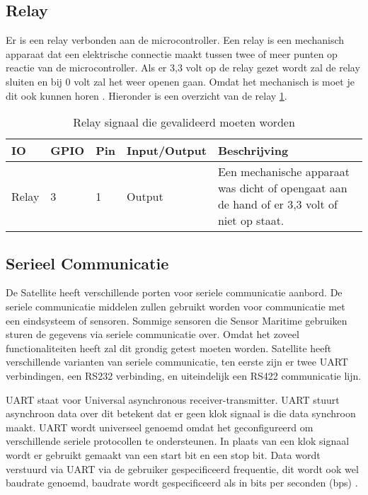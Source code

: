 \subsection{Relay}
Er is een relay verbonden aan de microcontroller. Een relay is een mechanisch apparaat dat een elektrische connectie maakt tussen twee of meer punten op reactie van de microcontroller. Als er 3,3 volt op de relay gezet wordt zal de relay sluiten en bij 0 volt zal het weer openen gaan. Omdat het mechanisch is moet je dit ook kunnen horen \autocite{relay}. Hieronder is een overzicht van de relay \ref{tab:hw_val_relay}.

\begin{table}[h!]
	\caption{Relay signaal die gevalideerd moeten worden}
	\begin{tabular}{llllp{9cm}}
	\toprule
	\textbf{IO} & \textbf{GPIO} & \textbf{Pin} & \textbf{Input/Output} & \textbf{Beschrijving}			\\ \toprule
	Relay		& 3 & 1   	& Output		& Een mechanische apparaat was dicht of opengaat aan de hand of er 3,3 volt of niet op staat.	\\ \bottomrule
	\end{tabular}
	\label{tab:hw_val_relay}
\end{table}

\subsection{Serieel Communicatie}
De Satellite heeft verschillende porten voor seriele communicatie aanbord. De seriele communicatie middelen zullen gebruikt worden voor communicatie met een eindsysteem of sensoren. Sommige sensoren die Sensor Maritime gebruiken sturen de gegevens via seriele communicatie over. Omdat het zoveel functionaliteiten heeft zal dit grondig getest moeten worden. Satellite heeft verschillende varianten van seriele communicatie, ten eerste zijn er twee UART verbindingen, een RS232 verbinding, en uiteindelijk een RS422 communicatie lijn. \newline

\noindent UART staat voor Universal asynchronous receiver-transmitter. UART stuurt asynchroon data over dit betekent dat er geen klok signaal is die data synchroon maakt. UART wordt universeel genoemd omdat het geconfigureerd om verschillende seriele protocollen te ondersteunen. In plaats van een klok signaal wordt er gebruikt gemaakt van een start bit en een stop bit. Data wordt verstuurd via UART via de gebruiker gespecificeerd frequentie, dit wordt ook wel baudrate genoemd, baudrate wordt gespecificeerd als in bits per seconden (bps) \autocite{UART}. \newline

